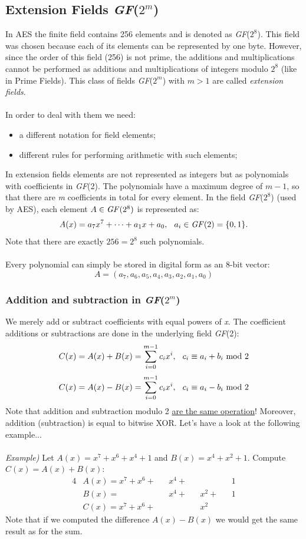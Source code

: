 \documentclass[11pt, a4paper]{article}
\newcommand{\gf}[1]{\textit{GF}(#1)}
\newcommand{\mymod}{
    \text{ mod }
}
\begin{document}
\subsection{Extension Fields \gf{$2^m$}}
In AES the finite field contains 256 elements and is denoted as \gf{$2^8$}. This field was chosen because each of its elements can be represented by one byte. However, since the order of this field (256) is not prime, the additions and multiplications cannot be performed as additions and multiplications of integers modulo $2^8$ (like in Prime Fields). This class of fields \gf{$2^m$} with $m>1$ are called \textit{extension fields}.\\\\
In order to deal with them we need:
\begin{itemize}
    \item a different notation for field elements;
    \item different rules for performing arithmetic with such elements;
\end{itemize}
In extension fields elements are not represented as integers but as polynomials with coefficients in \gf{2}. The polynomials have a maximum degree of $m-1$, so that there are \textit{m} coefficients in total for every element. In the field \gf{$2^8$} (used by AES), each element $A\in\text{\gf{$2^8$}}$ is represented as:
$$A(x)=a_7x^7+\cdots+a_1x+a_0,\hspace{0.25cm} a_i\in\text{\gf{2}}=\{0,1\}.$$
Note that there are exactly $256=2^8$ such polynomials.\\\\
Every polynomial can simply be stored in digital form as an 8-bit vector:
$$A=(a_7,a_6,a_5,a_4,a_3,a_2,a_1,a_0)$$

\subsubsection{Addition and subtraction in \gf{$2^m$}}
We merely add or subtract coefficients with equal powers of \textit{x}. The coefficient additions or subtractions are done in the underlying field \gf{2}:
$$C(x)=A(x)+B(x)=\displaystyle\sum_{i=0}^{m-1}c_ix^i,\hspace{0.25cm}c_i\equiv a_i+b_i\mymod2$$
$$C(x)=A(x)-B(x)=\displaystyle\sum_{i=0}^{m-1}c_ix^i,\hspace{0.25cm}c_i\equiv a_i-b_i\mymod2$$
Note that addition and subtraction modulo 2 \underline{are the same operation}! Moreover, addition (subtraction) is equal to bitwise XOR. Let's have a look at the following example...\\\\
\textit{Example)} Let $A(x)=x^7+x^6+x^4+1$ and $B(x)=x^4+x^2+1$. Compute $C(x)=A(x)+B(x)$:
\begin{alignat*}{4}
    &A(x)=x^7+x^6+&&x^4+&&&&1\\
    &B(x)=        &&x^4+&&x^2+&&1\\
    &C(x)=x^7+x^6+&&&&x^2
\end{alignat*}
Note that if we computed the difference $A(x)-B(x)$ we would get the same result as for the sum.
\end{document}
